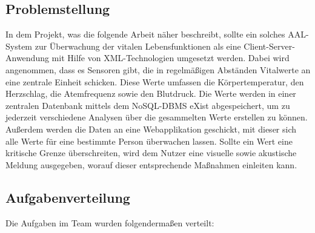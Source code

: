\subsection{Problemstellung}
In dem Projekt, was die folgende Arbeit näher beschreibt, sollte ein solches AAL-System zur Überwachung der vitalen Lebensfunktionen als eine Client-Server-Anwendung mit Hilfe von XML-Technologien umgesetzt werden. Dabei wird angenommen, dass es Sensoren gibt, die in regelmäßigen Abständen Vitalwerte an eine zentrale Einheit schicken. Diese Werte umfassen die Körpertemperatur, den Herzschlag, die Atemfrequenz sowie den Blutdruck. Die Werte werden in einer zentralen Datenbank mittels dem NoSQL-DBMS eXist abgespeichert, um zu jederzeit verschiedene Analysen über die gesammelten Werte erstellen zu können. Außerdem werden die Daten an eine Webapplikation geschickt, mit dieser sich alle Werte für eine bestimmte Person überwachen lassen. Sollte ein Wert eine kritische Grenze überschreiten, wird dem Nutzer eine visuelle sowie akustische Meldung ausgegeben, worauf dieser entsprechende Maßnahmen einleiten kann.

\newpage
\subsection{Aufgabenverteilung}
Die Aufgaben im Team wurden folgendermaßen verteilt:

